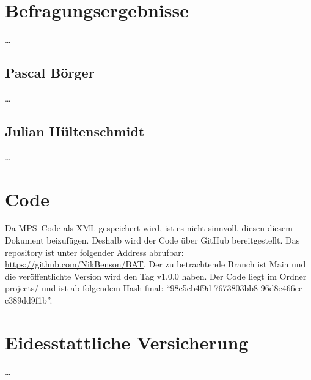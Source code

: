 \appendix


\section{Befragungsergebnisse}\label{sec:befragungsergebnisse}
\ldots

\subsection{Pascal Börger}\label{subsec:pascal-borger}
\ldots

\subsection{Julian Hültenschmidt}\label{subsec:julian-hultenschmidt}
\ldots

\section{Code}\label{sec:code}
Da \acs{MPS}--Code als \ac{XML} gespeichert wird, ist es nicht sinnvoll, diesen diesem Dokument beizufügen.
Deshalb wird der Code über GitHub bereitgestellt.
Das repository ist unter folgender Address abrufbar: \href{https://github.com/NikBenson/BAT}{https://github.com/NikBenson/BAT}.
Der zu betrachtende Branch ist Main und die veröffentlichte Version wird den Tag {\ttfamily v1.0.0} haben.
Der Code liegt im Ordner {\ttfamily projects/} und ist ab folgendem Hash final: \enquote{98c5cb4f9d-7673803bb8-96d8e466ec-c389dd9f1b}.


\section{Eidesstattliche Versicherung}\label{sec:eidesstattliche-versicherung}
\ldots


